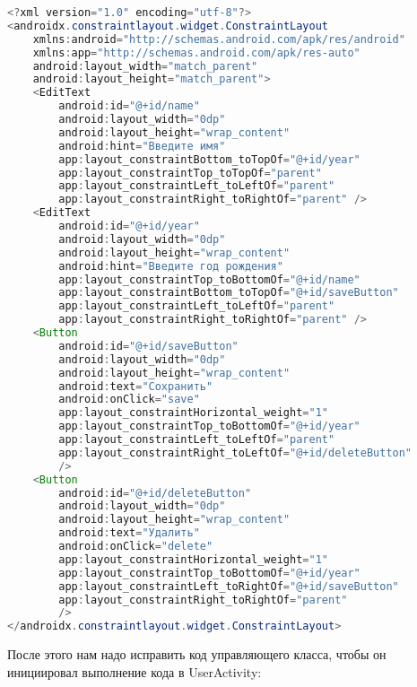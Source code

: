 \begin{lstlisting}[language=Java
	, label=lst:
	]
<?xml version="1.0" encoding="utf-8"?>
<androidx.constraintlayout.widget.ConstraintLayout
    xmlns:android="http://schemas.android.com/apk/res/android"
    xmlns:app="http://schemas.android.com/apk/res-auto"
    android:layout_width="match_parent"
    android:layout_height="match_parent">
    <EditText
        android:id="@+id/name"
        android:layout_width="0dp"
        android:layout_height="wrap_content"
        android:hint="Введите имя"
        app:layout_constraintBottom_toTopOf="@+id/year"
        app:layout_constraintTop_toTopOf="parent"
        app:layout_constraintLeft_toLeftOf="parent"
        app:layout_constraintRight_toRightOf="parent" />
    <EditText
        android:id="@+id/year"
        android:layout_width="0dp"
        android:layout_height="wrap_content"
        android:hint="Введите год рождения"
        app:layout_constraintTop_toBottomOf="@+id/name"
        app:layout_constraintBottom_toTopOf="@+id/saveButton"
        app:layout_constraintLeft_toLeftOf="parent"
        app:layout_constraintRight_toRightOf="parent" />
    <Button
        android:id="@+id/saveButton"
        android:layout_width="0dp"
        android:layout_height="wrap_content"
        android:text="Сохранить"
        android:onClick="save"
        app:layout_constraintHorizontal_weight="1"
        app:layout_constraintTop_toBottomOf="@+id/year"
        app:layout_constraintLeft_toLeftOf="parent"
        app:layout_constraintRight_toLeftOf="@+id/deleteButton"
        />
    <Button
        android:id="@+id/deleteButton"
        android:layout_width="0dp"
        android:layout_height="wrap_content"
        android:text="Удалить"
        android:onClick="delete"
        app:layout_constraintHorizontal_weight="1"
        app:layout_constraintTop_toBottomOf="@+id/year"
        app:layout_constraintLeft_toRightOf="@+id/saveButton"
        app:layout_constraintRight_toRightOf="parent"
        />
</androidx.constraintlayout.widget.ConstraintLayout>
\end{lstlisting}

После этого нам надо исправить код управляющего класса, чтобы
он инициировал выполнение кода в UserActivity:

